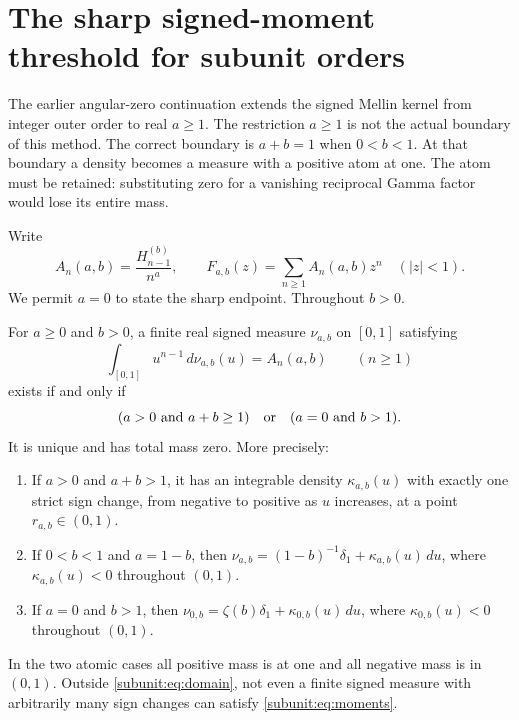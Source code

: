 \section{The sharp signed-moment threshold for subunit orders}
\label{subunit:sec:main}

The earlier angular-zero continuation \cite{AngularBaseline} extends the signed Mellin kernel
from integer outer order to real $a\geq1$. The restriction $a\geq1$ is
not the actual boundary of this method. The correct boundary is
$a+b=1$ when $0<b<1$. At that boundary a density becomes a measure with
a positive atom at one. The atom must be retained: substituting zero
for a vanishing reciprocal Gamma factor would lose its entire mass.

Write
\[
 A_n(a,b)=\frac{H_{n-1}^{(b)}}{n^a},\qquad
 F_{a,b}(z)=\sum_{n\geq1}A_n(a,b)z^n\quad(|z|<1).
\]
We permit $a=0$ to state the sharp endpoint. Throughout $b>0$.

\begin{theorem}
\label{subunit:thm:domain}
For $a\geq0$ and $b>0$, a finite real signed measure $\nu_{a,b}$ on
$[0,1]$ satisfying
\begin{equation}\label{subunit:eq:moments}
 \int_{[0,1]}u^{n-1}\,d\nu_{a,b}(u)=A_n(a,b)
 \qquad(n\geq1)
\end{equation}
exists if and only if
\begin{equation}\label{subunit:eq:domain}
 (a>0\ \hbox{and}\ a+b\geq1)
 \quad\hbox{or}\quad(a=0\ \hbox{and}\ b>1).
\end{equation}
It is unique and has total mass zero. More precisely:
\begin{enumerate}
\item If $a>0$ and $a+b>1$, it has an integrable density
      $\kappa_{a,b}(u)$ with exactly one strict sign change, from
      negative to positive as $u$ increases, at a point $r_{a,b}\in(0,1)$.
\item If $0<b<1$ and $a=1-b$, then
      $\nu_{a,b}=(1-b)^{-1}\delta_1+\kappa_{a,b}(u)\,du$,
      where $\kappa_{a,b}(u)<0$ throughout $(0,1)$.
\item If $a=0$ and $b>1$, then
      $\nu_{0,b}=\zeta(b)\delta_1+\kappa_{0,b}(u)\,du$,
      where $\kappa_{0,b}(u)<0$ throughout $(0,1)$.
\end{enumerate}
In the two atomic cases all positive mass is at one and all negative
mass is in $(0,1)$. Outside \eqref{subunit:eq:domain}, not even a
finite signed measure with arbitrarily many sign changes can satisfy
\eqref{subunit:eq:moments}.
\end{theorem}

